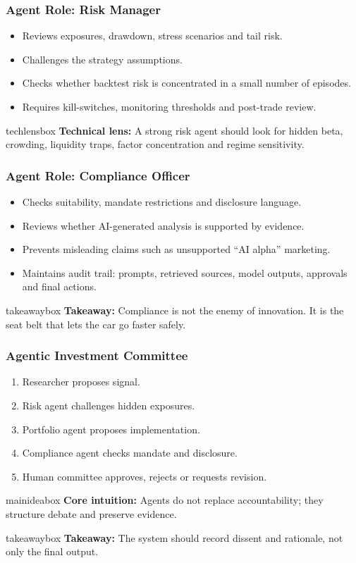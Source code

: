 \documentclass[aspectratio=169,12pt]{beamer}
\newcommand{\currentframetitle}{}
\newcommand{\slideTitle}[1]{\gdef\currentframetitle{#1}\frametitle{#1}}
\newcommand{\mainidea}[1]{%
  \vspace{0.08cm}
  \begin{beamercolorbox}[wd=\linewidth,rounded=true,sep=0.18cm]{mainideabox}
    \small\textbf{Core intuition:} #1
  \end{beamercolorbox}%
}
\newcommand{\techlens}[1]{%
  \vspace{0.08cm}
  \begin{beamercolorbox}[wd=\linewidth,rounded=true,sep=0.18cm]{techlensbox}
    \small\textbf{Technical lens:} #1
  \end{beamercolorbox}%
}
\newcommand{\takeaway}[1]{%
  \vspace{0.08cm}
  \begin{beamercolorbox}[wd=\linewidth,rounded=true,sep=0.18cm]{takeawaybox}
    \small\textbf{Takeaway:} #1
  \end{beamercolorbox}%
}
\begin{document}
\begin{frame}
\slideTitle{Agent Role: Risk Manager}
\begin{itemize}
  \item Reviews exposures, drawdown, stress scenarios and tail risk.
  \item Challenges the strategy assumptions.
  \item Checks whether backtest risk is concentrated in a small number of episodes.
  \item Requires kill-switches, monitoring thresholds and post-trade review.
\end{itemize}
\techlens{A strong risk agent should look for hidden beta, crowding, liquidity traps, factor concentration and regime sensitivity.}
\end{frame}

\begin{frame}
\slideTitle{Agent Role: Compliance Officer}
\begin{itemize}
  \item Checks suitability, mandate restrictions and disclosure language.
  \item Reviews whether AI-generated analysis is supported by evidence.
  \item Prevents misleading claims such as unsupported ``AI alpha'' marketing.
  \item Maintains audit trail: prompts, retrieved sources, model outputs, approvals and final actions.
\end{itemize}
\takeaway{Compliance is not the enemy of innovation. It is the seat belt that lets the car go faster safely.}
\end{frame}

\begin{frame}
\slideTitle{Agentic Investment Committee}
\begin{enumerate}
  \item Researcher proposes signal.
  \item Risk agent challenges hidden exposures.
  \item Portfolio agent proposes implementation.
  \item Compliance agent checks mandate and disclosure.
  \item Human committee approves, rejects or requests revision.
\end{enumerate}
\mainidea{Agents do not replace accountability; they structure debate and preserve evidence.}
\takeaway{The system should record dissent and rationale, not only the final output.}
\end{frame}
\end{document}
